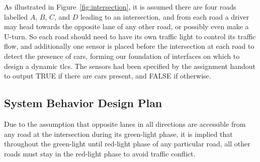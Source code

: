 As illustrated in Figure~\ref{fig:intersection}, it is assumed there are four roads labelled $A$, $B$, $C$, and $D$ leading to an intersection, and from each road a driver may head towards the opposite lane of any other road, or possibly even make a U-turn. So each road should need to have its own traffic light to control its traffic flow, and additionally one sensor is placed before the intersection at each road to detect the presence of cars, forming our foundation of interfaces on which to design a dynamic \ac{tlcs}. The sensors had been specified by the assignment handout to output TRUE if there are cars present, and FALSE if otherwise.

\subsection{System Behavior Design Plan\label{section:behavior_plan}}
Due to the assumption that opposite lanes in all directions are accessible from any road at the intersection during its green-light phase, it is implied that throughout the green-light until red-light phase of any particular road, all other roads must stay in the red-light phase to avoid traffic conflict.
